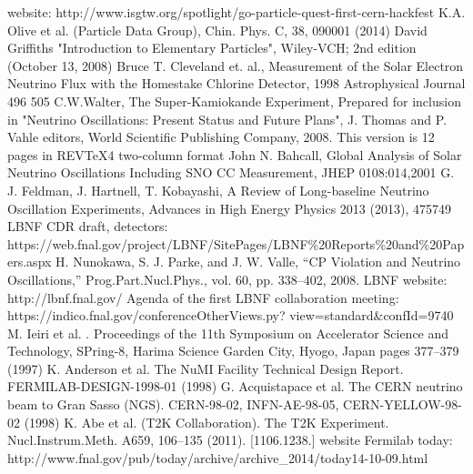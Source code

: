 \begin{thebibliography}{1}
    website: http://www.isgtw.org/spotlight/go-particle-quest-first-cern-hackfest
    K.A. Olive et al. (Particle Data Group), Chin. Phys. C, 38, 090001 (2014) 
    David Griffiths "Introduction to Elementary Particles", Wiley-VCH; 2nd edition (October 13, 2008)
    Bruce T. Cleveland et. al., Measurement of the Solar Electron Neutrino Flux with the Homestake Chlorine Detector, 1998 Astrophysical Journal 496 505
    C.W.Walter, The Super-Kamiokande Experiment, Prepared for inclusion in "Neutrino Oscillations: Present Status and Future Plans", J. Thomas and P. Vahle editors, World Scientific Publishing Company, 2008. This version is 12 pages in REVTeX4 two-column format
    John N. Bahcall, Global Analysis of Solar Neutrino Oscillations Including SNO CC Measurement, JHEP 0108:014,2001
    G. J. Feldman, J. Hartnell, T. Kobayashi, A Review of Long-baseline Neutrino Oscillation Experiments, Advances in High Energy Physics 2013 (2013), 475749
    LBNF CDR draft, detectors: https://web.fnal.gov/project/LBNF/SitePages/LBNF\%20Reports\%20and\%20Papers.aspx
    H. Nunokawa, S. J. Parke, and J. W. Valle, “CP Violation and Neutrino Oscillations,”
Prog.Part.Nucl.Phys., vol. 60, pp. 338–402, 2008.
    LBNF website: http://lbnf.fnal.gov/
    Agenda of the first LBNF collaboration meeting: https://indico.fnal.gov/conferenceOtherViews.py? view=standard\&confId=9740
    M. Ieiri et al. . Proceedings of the 11th Symposium on Accelerator Science and Technology, SPring-8,
Harima Science Garden City, Hyogo, Japan pages 377–379 (1997)
    K. Anderson et al. The NuMI Facility Technical Design Report. FERMILAB-DESIGN-1998-01 (1998)
    G. Acquistapace et al. The CERN neutrino beam to Gran Sasso (NGS). CERN-98-02, INFN-AE-98-05,
CERN-YELLOW-98-02 (1998)
    K. Abe et al. (T2K Collaboration). The T2K Experiment. Nucl.Instrum.Meth. A659, 106–135 (2011).
[1106.1238.]
    website Fermilab today: http://www.fnal.gov/pub/today/archive/archive\_2014/today14-10-09.html
\end{thebibliography}
